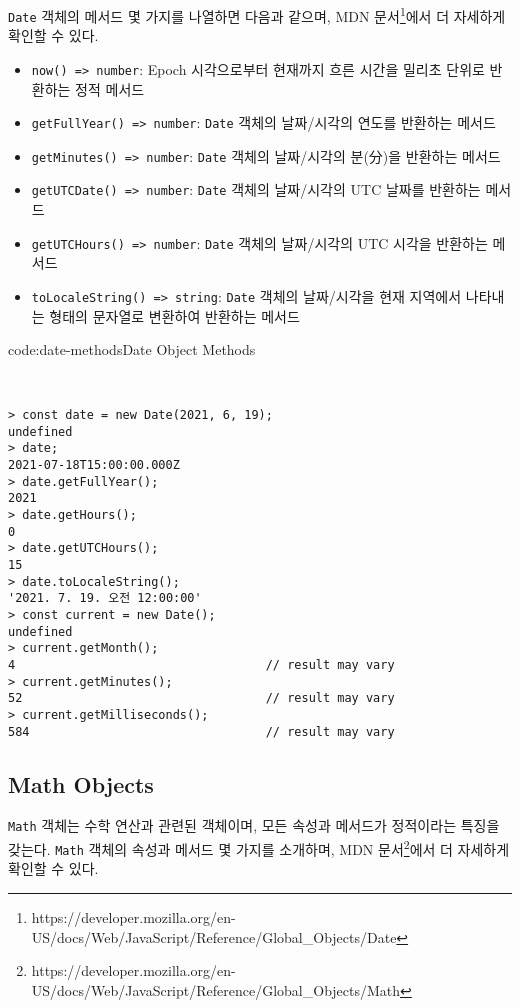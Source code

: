 \texttt{Date} 객체의 메서드 몇 가지를 나열하면 다음과 같으며, MDN 문서\footnote{https://developer.mozilla.org/en-US/docs/Web/JavaScript/Reference/Global\_Objects/Date}에서 더 자세하게 확인할 수 있다.

\begin{itemize}
    \item \texttt{now() => number}: Epoch 시각으로부터 현재까지 흐른 시간을 밀리초 단위로 반환하는 정적 메서드
    \item \texttt{getFullYear() => number}: \texttt{Date} 객체의 날짜/시각의 연도를 반환하는 메서드
    \item \texttt{getMinutes() => number}: \texttt{Date} 객체의 날짜/시각의 분(分)을 반환하는 메서드
    \item \texttt{getUTCDate() => number}: \texttt{Date} 객체의 날짜/시각의 UTC 날짜를 반환하는 메서드
    \item \texttt{getUTCHours() => number}: \texttt{Date} 객체의 날짜/시각의 UTC 시각을 반환하는 메서드
    \item \texttt{toLocaleString() => string}: \texttt{Date} 객체의 날짜/시각을 현재 지역에서 나타내는 형태의 문자열로 변환하여 반환하는 메서드
\end{itemize}

\begin{codeenv}{code:date-methods}{Date Object Methods}\begin{verbatim}


> const date = new Date(2021, 6, 19);
undefined
> date;
2021-07-18T15:00:00.000Z
> date.getFullYear();
2021
> date.getHours();
0
> date.getUTCHours();
15
> date.toLocaleString();
'2021. 7. 19. 오전 12:00:00'
> const current = new Date();
undefined
> current.getMonth();
4                                   // result may vary
> current.getMinutes();
52                                  // result may vary
> current.getMilliseconds();
584                                 // result may vary
\end{verbatim}
\end{codeenv}
\pagebreak

\subsection*{Math Objects}

\texttt{Math} 객체는 수학 연산과 관련된 객체이며, 모든 속성과 메서드가 정적이라는 특징을 갖는다. \texttt{Math} 객체의 속성과 메서드 몇 가지를 소개하며, MDN 문서\footnote{https://developer.mozilla.org/en-US/docs/Web/JavaScript/Reference/Global\_Objects/Math}에서 더 자세하게 확인할 수 있다.

